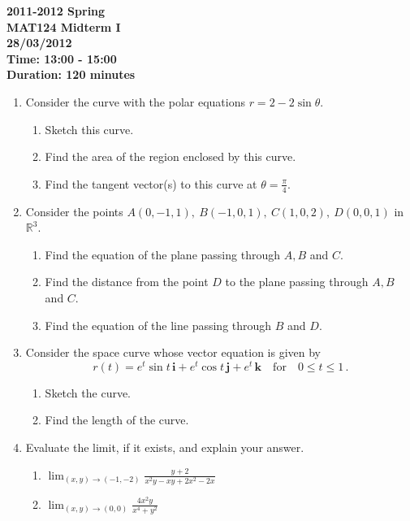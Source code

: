 \documentclass[a4paper, 12pt]{article}
\begin{document}
\pagestyle{empty}

\begin{center}
\textbf{2011-2012 Spring \\MAT124 Midterm I\\28/03/2012\\Time: 13:00 - 15:00\\Duration: 120 minutes}
\end{center}

\begin{enumerate}[leftmargin=*,label=\textbf{\arabic*.}]

\item Consider the curve with the polar equations $r=2-2\sin\theta$.
\begin{enumerate}[leftmargin=*,label=\textbf{\alph*.}]
\item Sketch this curve.
\item Find the area of the region enclosed by this curve.
\item Find the tangent vector(s) to this curve at $\displaystyle\theta=\frac\pi4$.
\end{enumerate}

\item Consider the points $A(0,-1,1),\:B(-1,0,1),\:C(1,0,2),\:D(0,0,1)$ in $\mathbb{R}^3$.
\begin{enumerate}[leftmargin=*,label=\textbf{\alph*.}]
\item Find the equation of the plane passing through $A, B$ and $C$.
\item Find the distance from the point $D$ to the plane passing through $A, B$ and $C$.
\item Find the equation of the line passing through $B$ and $D$.
\end{enumerate}

\item Consider the space curve whose vector equation is given by
\[r(t)= e ^t\sin t\,\mathbf{i}+ e ^t\cos t\,\mathbf{j}+ e ^t\,\mathbf{k} \quad\text{for}\quad 0\leq t\leq1\,.\]
\begin{enumerate}[leftmargin=*,label=\textbf{\alph*.}]
\item Sketch the curve.
\item Find the length of the curve.
\end{enumerate}

\item Evaluate the limit, if it exists, and explain your answer.
\begin{enumerate}[leftmargin=*,label=\textbf{\alph*.}]
\item $\displaystyle \lim_{(x,y)\to(-1,-2)}\frac{y+2}{x^2y-xy+2x^2-2x}$ \ \ \ \item $\displaystyle\lim_{(x,y)\to(0,0)}\frac{4x^2y}{x^4+y^2}$
\end{enumerate}


\end{enumerate}
\end{document}
